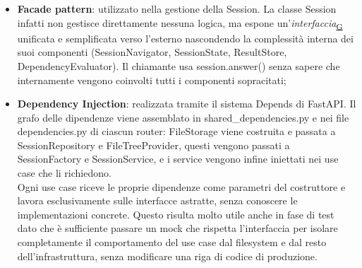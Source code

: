 \documentclass[a4paper,12pt]{article}
\begin{document}
\begin{itemize}
                    La classe SessionFactory incapsula questa logica di creazione, nascondendone i dettagli al client e semplificando l'uso del sistema: il client può ottenere un'istanza di Session 
                    semplicemente invocando il metodo {\ttfamily create()};
                \item \textbf{Facade pattern}: utilizzato nella gestione della Session. La classe Session infatti non gestisce direttamente nessuna logica, ma espone un'\textit{interfaccia}\textsubscript{\href{https://atlasteam9.github.io/Atlas/glossario.html\#Interfaccia}{G}} unificata e 
                    semplificata verso l'esterno nascondendo la complessità interna dei suoi componenti (SessionNavigator, SessionState, ResultStore, DependencyEvaluator). Il chiamante usa {\ttfamily session.answer()}
                    senza sapere che internamente vengono coinvolti tutti i componenti sopracitati;
                \item \textbf{Dependency Injection}: realizzata tramite il sistema Depends di FastAPI. Il grafo delle dipendenze viene assemblato in {\ttfamily shared\_dependencies.py} e nei file {\ttfamily dependencies.py} di ciascun router: FileStorage viene costruita e passata a SessionRepository e FileTreeProvider, questi vengono passati a SessionFactory e SessionService, e i service vengono infine iniettati nei use case che li richiedono.\\
                Ogni use case riceve le proprie dipendenze come parametri del costruttore e lavora esclusivamente sulle interfacce astratte, senza conoscere le implementazioni concrete. Questo risulta molto utile anche in fase di test dato che è sufficiente passare un mock che rispetta l'interfaccia per isolare completamente il comportamento del use case dal filesystem e dal resto dell'infrastruttura, senza modificare una riga di codice di produzione.
            \end{itemize}
    
\end{document}
